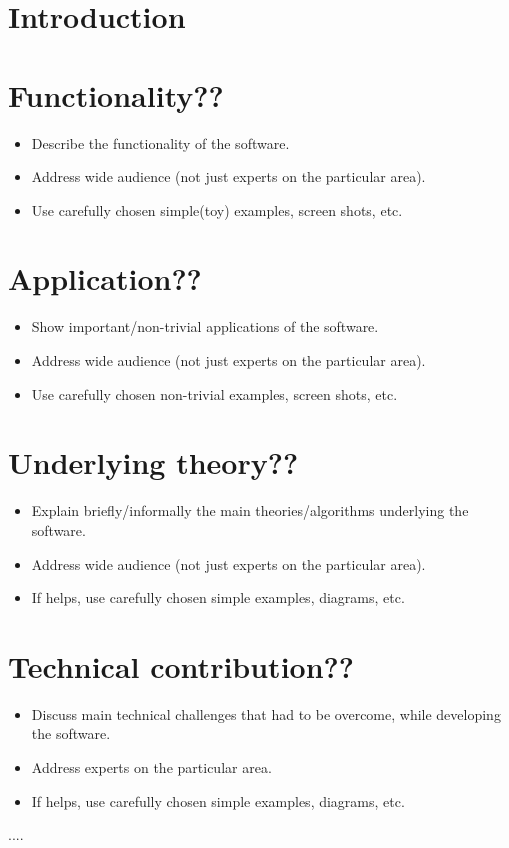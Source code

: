 \documentclass[runningheads,a4paper]{llncs}
\begin{document}
\section{Introduction}

\section{Functionality??}
\begin{itemize}
\item Describe the functionality of the software.
\item Address  wide audience (not just experts on the particular area).
\item Use carefully chosen  simple(toy) examples, screen shots, etc.
\end{itemize}
  
\section{Application??}
\begin{itemize}
\item Show important/non-trivial applications of the software.
\item Address wide audience (not just experts on the particular area).
\item Use carefully chosen  non-trivial  examples, screen shots, etc.
\end{itemize}

\section{Underlying theory??}
\begin{itemize}
\item Explain briefly/informally the main theories/algorithms underlying the software.
\item Address wide audience (not just experts on the particular area).
\item If helps, use carefully chosen  simple  examples, diagrams, etc.
\end{itemize}

\section{Technical contribution??}
\begin{itemize}
\item Discuss main technical challenges that had to be overcome, 
      while developing the software.
\item Address experts on the particular area.
\item If helps, use carefully chosen  simple  examples, diagrams, etc.
\end{itemize}


\begin{thebibliography}{4}
 .... 
\end{thebibliography}
\end{document}
